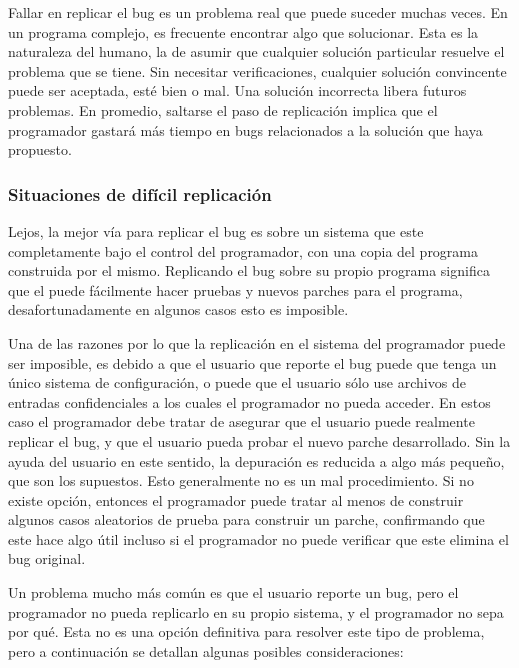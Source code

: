 \documentclass[12pt,legalpaper]{report}
\begin{document}
Fallar en replicar el bug es un problema real que puede suceder muchas veces.  En un programa complejo, es frecuente encontrar algo que solucionar.  Esta es la naturaleza del humano, la de asumir que cualquier solución particular resuelve el problema que se tiene.  Sin necesitar verificaciones, cualquier solución convincente puede ser aceptada, esté bien o mal.  Una solución incorrecta libera futuros problemas.  En promedio, saltarse el paso de replicación implica que el programador gastará más tiempo en bugs relacionados a la solución que haya propuesto.


\subsubsection{Situaciones de difícil replicación}

Lejos, la mejor vía para replicar el bug es sobre un sistema que este completamente bajo el control del programador, con una copia del programa construida por el mismo.  Replicando el bug sobre su propio programa significa que el puede fácilmente hacer pruebas y nuevos parches para el programa, desafortunadamente en algunos casos esto es imposible.

Una de las razones por lo que la replicación en el sistema del programador puede ser imposible, es debido a que el usuario que reporte el bug puede que tenga un único sistema de configuración, o puede que el usuario sólo use archivos de entradas confidenciales a los cuales el programador no pueda acceder.  En estos caso el programador debe tratar de asegurar que el usuario puede realmente replicar el bug, y que el usuario pueda probar el nuevo parche desarrollado.  Sin la ayuda del usuario en este sentido, la depuración es reducida a algo más pequeño, que son los supuestos.  Esto generalmente no es un mal procedimiento.  Si no existe opción, entonces el programador puede tratar al menos de construir algunos casos aleatorios de prueba para construir un parche, confirmando que este hace algo útil incluso si el programador no puede verificar que este elimina el bug original.

Un problema mucho más común es que el usuario reporte un bug, pero el programador no pueda replicarlo en su propio sistema, y el programador no sepa por qué.  Esta no es una opción definitiva para resolver este tipo de problema, pero a continuación se detallan algunas posibles consideraciones:
\end{document}

